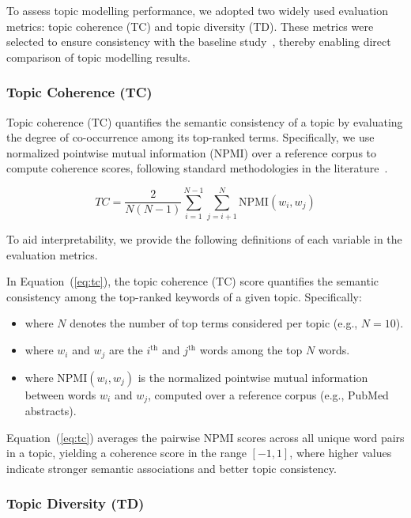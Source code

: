 \documentclass[authorproof,JACIII,researchpaper]{fujipressarticle}
\begin{document}
To assess topic modelling performance, we adopted two widely used evaluation metrics: topic coherence (TC) and topic diversity (TD). These metrics were selected to ensure consistency with the baseline study~\cite{lezhnina_depression_2023}, thereby enabling direct comparison of topic modelling results.

\subsubsection{Topic Coherence (TC)}

Topic coherence (TC) quantifies the semantic consistency of a topic by evaluating the degree of co-occurrence among its top-ranked terms. Specifically, we use normalized pointwise mutual information (NPMI) over a reference corpus to compute coherence scores, following standard methodologies in the literature~\cite{mimno_optimizing_2011,roder_exploring_2015}.

\begin{equation}
TC = \frac{2}{N(N-1)} \sum_{i=1}^{N-1} \sum_{j=i+1}^{N} \text{NPMI}(w_i, w_j)
\label{eq:tc}
\end{equation}

To aid interpretability, we provide the following definitions of each variable in the evaluation metrics.

In Equation~(\ref{eq:tc}), the topic coherence (TC) score quantifies the semantic consistency among the top-ranked keywords of a given topic. Specifically:

\begin{itemize}
    \item where $N$ denotes the number of top terms considered per topic (e.g., $N = 10$).

    \item where $w_i$ and $w_j$ are the $i^{\text{th}}$ and $j^{\text{th}}$ words among the top $N$ words.

    \item where NPMI$(w_i, w_j)$ is the normalized pointwise mutual information between words $w_i$ and $w_j$, computed over a reference corpus (e.g., PubMed abstracts).
\end{itemize}

Equation~(\ref{eq:tc}) averages the pairwise NPMI scores across all unique word pairs in a topic, yielding a coherence score in the range $[-1, 1]$, where higher values indicate stronger semantic associations and better topic consistency.

\subsubsection{Topic Diversity (TD)}
\end{document}

